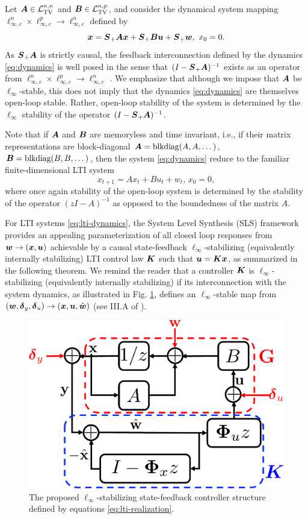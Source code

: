 Let $\boldsymbol{A} \in \mathcal{L}_{\mathrm{TV}}^{n,n}$ and $\boldsymbol{B} \in \mathcal{L}_{\mathrm{TV}}^{n,p}$, and consider the dynamical system mapping $\ell^n_{\infty,e} \times \ell^p_{\infty,e} \to \ell^n_{\infty,e}$ defined by
\begin{equation}
\boldsymbol{x} = \boldsymbol{S}_+\boldsymbol{A}\boldsymbol{x} + \boldsymbol{S}_+ \boldsymbol{B} \boldsymbol{u} + \boldsymbol{S}_+ \boldsymbol{w}, \ x_0 = 0.
\label{eq:dynamics}
\end{equation}
As $\boldsymbol{S}_+\boldsymbol{A}$ is strictly causal, the feedback interconnection defined by the dynamics \eqref{eq:dynamics} is well posed in the sense that $(I-\boldsymbol{S}_+\boldsymbol{A})^{-1}$ exists as an operator from $\ell^n_{\infty,e} \times \ell^p_{\infty,e} \to \ell^n_{\infty,e}$ \cite{dahleh1994control}.  We emphasize that although we impose that $\boldsymbol{A}$ be $\ell_\infty$-stable, this does not imply that the dynamics \eqref{eq:dynamics} are themselves open-loop stable.  Rather, open-loop stability of the system is determined by the $\ell_\infty$ stability of the operator $(I-\boldsymbol{S}_+\boldsymbol{A})^{-1}$.

Note that if $\boldsymbol{A}$ and $\boldsymbol{B}$ are memoryless and time invariant, i.e., if their matrix representations are block-diagonal $\boldsymbol{A} = \mathrm{blkdiag}(A,A,\dots)$, $\boldsymbol{B} = \mathrm{blkdiag}(B,B,\dots)$, then the system \eqref{eq:dynamics} reduce to the familiar finite-dimensional LTI system
\begin{equation}
x_{t+1} = A x_t + Bu_t + w_t, \, x_0 = 0,
\label{eq:lti-dynamics}
\end{equation}
where once again stability of the open-loop system is determined by the stability of the operator $(zI-A)^{-1}$ as opposed to the boundedness of the matrix $A$.

For LTI systems \eqref{eq:lti-dynamics}, the System Level Synthesis (SLS) framework \cite{wang2019system,anderson2019system} provides an appealing parameterization of all closed loop responses from $\boldsymbol{w} \to (\boldsymbol{x}, \boldsymbol{u})$ achievable by a causal state-feedback $\ell_\infty$-stabilizing (equivalently internally stabilizing) LTI control law $\boldsymbol{K}$ such that $\boldsymbol{u} = \boldsymbol{K} \boldsymbol{x}$, as summarized in the following theorem.  We remind the reader that a controller $\boldsymbol{K}$ is $\ell_\infty$-stabilizing (equivalently internally stabilizing) if its interconnection with the system dynamics, as illustrated in Fig. \ref{fig:lti-interconnect}, defines an $\ell_\infty$-stable map from $(\boldsymbol{w}, \boldsymbol{\delta}_y, \boldsymbol{\delta}_u) \to (\boldsymbol{x}, \boldsymbol{u}, \hat{\boldsymbol{w}})$ (see III.A of \cite{wang2019system}).

\begin{figure}
\centering
\includegraphics[width=.35\textwidth]{lti-interconnect}
\caption{The proposed $\ell_\infty$-stabilizing state-feedback controller structure defined by equations \eqref{eq:lti-realization}.}
\label{fig:lti-interconnect}
\end{figure}

